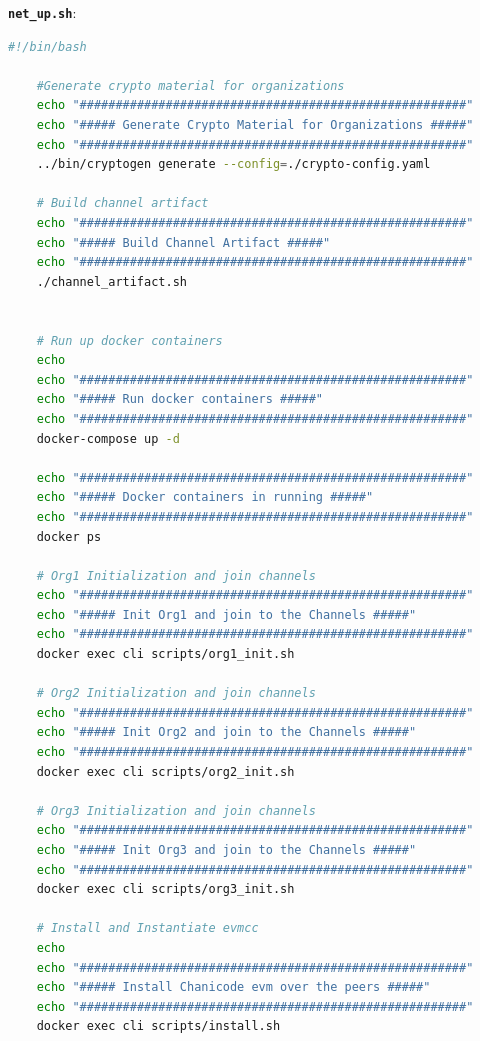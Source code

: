 \textbf{\texttt{net\_up.sh}}:

\begin{lstlisting}[language=bash]
    #!/bin/bash

    #Generate crypto material for organizations
    echo "######################################################"
    echo "##### Generate Crypto Material for Organizations #####"
    echo "######################################################"
    ../bin/cryptogen generate --config=./crypto-config.yaml

    # Build channel artifact
    echo "######################################################"
    echo "##### Build Channel Artifact #####"
    echo "######################################################"
    ./channel_artifact.sh


    # Run up docker containers
    echo
    echo "######################################################"
    echo "##### Run docker containers #####"
    echo "######################################################"
    docker-compose up -d

    echo "######################################################"
    echo "##### Docker containers in running #####"
    echo "######################################################"
    docker ps

    # Org1 Initialization and join channels
    echo "######################################################"
    echo "##### Init Org1 and join to the Channels #####"
    echo "######################################################"
    docker exec cli scripts/org1_init.sh

    # Org2 Initialization and join channels
    echo "######################################################"
    echo "##### Init Org2 and join to the Channels #####"
    echo "######################################################"
    docker exec cli scripts/org2_init.sh

    # Org3 Initialization and join channels
    echo "######################################################"
    echo "##### Init Org3 and join to the Channels #####"
    echo "######################################################"
    docker exec cli scripts/org3_init.sh

    # Install and Instantiate evmcc
    echo
    echo "######################################################"
    echo "##### Install Chanicode evm over the peers #####"
    echo "######################################################"
    docker exec cli scripts/install.sh
\end{lstlisting}

